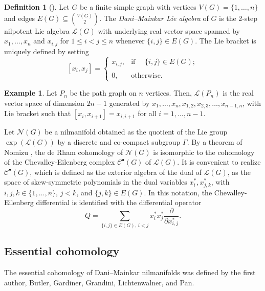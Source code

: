 \documentclass[12pt]{amsart}
\theoremstyle{definition}
\newtheorem{mydef}[theorem]{Definition}
\newtheorem{example}[theorem]{Example}
\begin{document}
\begin{mydef}[{\cite[\S 1]{DaniMainkar05}}]\label{def:1}
Let $G$ be a finite simple graph with vertices $V(G)=\{1,\ldots,n\}$ and edges $E(G)\subseteq \binom{V(G)}{2}$. The \emph{Dani--Mainkar Lie algebra} of $G$ is the 2-step nilpotent Lie algebra $\mathcal L(G)$ with underlying real vector space spanned by $x_1,\ldots,x_n$ and $x_{i,j}$ for $1\le i<j\le n$ whenever $\{i,j\}\in E(G)$. The Lie bracket is uniquely defined by setting \[[x_i,x_j]=\begin{cases}
x_{i,j}, & \textrm{if }\quad \{i,j\}\in E(G);\\
\\
0, & \textrm{otherwise}.
    \end{cases}\]
\end{mydef}

\begin{example}\label{ex:2}
Let $P_n$ be the path graph on $n$ vertices. Then, $\mathcal L(P_n)$ is the real vector space of dimension $2n-1$ generated by $x_1,\ldots,x_n,x_{1,2},x_{2,3},\ldots,x_{n-1,n}$, with Lie bracket such that $[x_i,x_{i+1}]=x_{i,i+1}$ for all $i=1,\ldots,n-1$. 
\end{example}

Let $\mathcal N(G)$ be a nilmanifold obtained as the quotient of the Lie group $\exp(\mathcal L(G))$ by a discrete and co-compact subgroup $\Gamma$. By a theorem of Nomizu \cite[Theorem 1]{Nomizu54}, the de Rham cohomology of $\mathcal N(G)$ is isomorphic to the cohomology of the Chevalley-Eilenberg complex $\mathcal C^\bullet(G)$ of $\mathcal L(G)$. It is convenient to realize $\mathcal C^\bullet(G)$, which is defined as the exterior algebra of the dual of $\mathcal L(G)$, as the space of skew-symmetric polynomials in the dual variables $x_i^*,x_{j,k}^*$, with $i,j,k\in\{1,\ldots,n\}$, $j<k$, and $\{j,k\}\in E(G)$. In this notation, the Chevalley-Eilenberg differential is identified with the differential operator 
\[Q=\sum_{\{i,j\}\in E(G), \, i<j}x_i^*x_j^*\frac{\partial}{\partial x_{i,j}^*}.\]

\subsection{Essential cohomology}\label{sec:2.2} The essential cohomology of Dani--Mainkar nilmanifolds was defined by the first author, Butler, Gardiner, Grandini, Lichtenwalner, and Pan.
\end{document}
